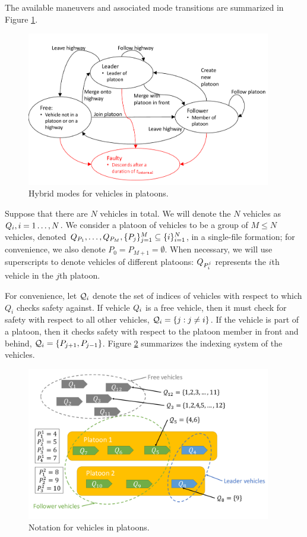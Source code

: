 The available maneuvers and associated mode transitions are summarized in Figure \ref{fig:vehicleModes}.

\begin{figure}
	\centering
	\includegraphics[width=0.95\textwidth]{"fig/vehicleModes"}
	\caption{Hybrid modes for vehicles in platoons.}
	\label{fig:vehicleModes}
\end{figure}

Suppose that there are $N$ vehicles in total. We will denote the $N$ vehicles as $Q_{i}, i=1\ldots,N$. We consider a platoon of vehicles to be a group of $M\le N$ vehicles, denoted $Q_{P_1}, \ldots, Q_{P_M}, \{P_j\}_{j=1}^M \subseteq \{i\}_{i=1}^N$, in a single-file formation; for convenience, we also denote $P_0 = P_{M+1} = \emptyset$. When necessary, we will use superscripts to denote vehicles of different platoons: $Q_{P_i^j}$ represents the $i$th vehicle in the $j$th platoon. 

For convenience, let $\mathcal{Q}_{i}$ denote the set of indices of vehicles with respect to which $Q_i$ checks safety against. If vehicle $Q_{i}$ is a free vehicle, then it must check for safety with respect to all other vehicles, $\mathcal{Q}_{i} = \{j: j\neq i\}$. If the vehicle is part of a platoon, then it checks safety with respect to the platoon member in front and behind, $\mathcal{Q}_{i} = \{P_{j+1}, P_{j-1}\}$. Figure \ref{fig:vehicleNotation} summarizes the indexing system of the vehicles.

\begin{figure}
	\centering
	\includegraphics[width=0.95\textwidth]{"fig/vehicleNotation"}
	\caption{Notation for vehicles in platoons.}
	\label{fig:vehicleNotation}
\end{figure}

